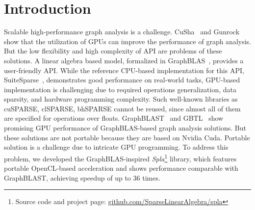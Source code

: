 \section{Introduction}


Scalable high-performance graph analysis is a challenge.
CuSha~\cite{10.1145/2600212.2600227} and Gunrock~\cite{7967137} show that the utilization of GPUs can improve the performance of graph analysis. But the low flexibility and high complexity of API are problems of these solutions. 
A linear algebra based model, formalized in GraphBLAS~\cite{7761646}, provides a user-friendly API. 
While the reference CPU-based implementation for this API, SuiteSparse~\cite{10.1145/3322125}, demonstrates good performance on real-world tasks, GPU-based implementation is challenging due to required operations generalization, data sparsity, and hardware programming complexity. 
Such well-known libraries as cuSPARSE, clSPARSE, bhSPARSE cannot be reused, since almost all of them are specified for operations over floats. 
GraphBLAST~\cite{yang2019graphblast} and GBTL~\cite{7529957} show promising GPU performance of GraphBLAS-based graph analysis solutions. 
But these solutions are not portable because they are based on Nvidia Cuda. 
Portable solution is a challenge due to intricate GPU programming. 
To address this problem, we developed the GraphBLAS-inspired \textit{Spla}\footnote{Source code and project page: \url{github.com/SparseLinearAlgebra/spla}} library, which features portable OpenCL-based acceleration and shows performance comparable with GraphBLAST, achieving speedup of up to 36 times.